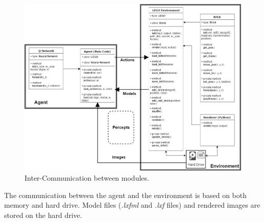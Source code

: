 \documentclass[a4paper]{article}
\begin{document}
            \begin{figure}[h]
                \centering
                \includegraphics[height=0.99\textwidth, angle=-90]{inter-communication.png}
                \caption{Inter-Communication between modules.} 
                \label{fig:inter-communication}
                
            \end{figure}
        
	        The communication between the agent and the environment is based on both memory and hard drive. Model files (\textit{.lxfml} and \textit{.lxf} files) and rendered images are stored on the hard drive.
	        
	        
            
            
            
            
            

            

            
            
            
            
            

            
\end{document}

